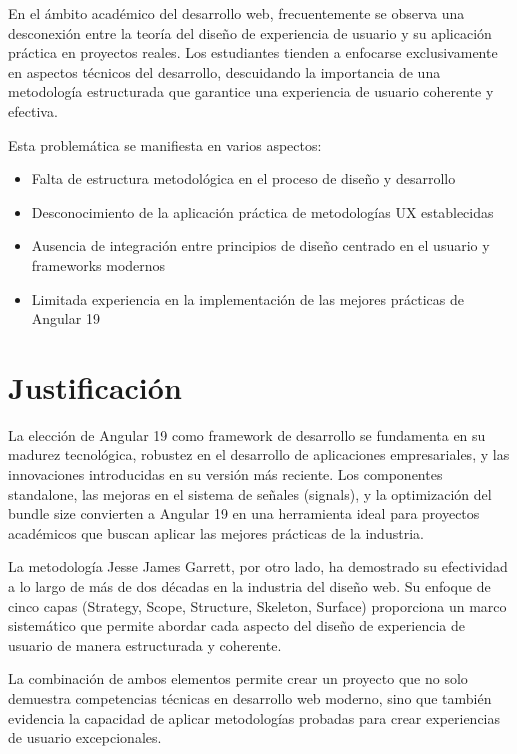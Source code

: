 En el ámbito académico del desarrollo web, frecuentemente se observa una desconexión entre la teoría del diseño de experiencia de usuario y su aplicación práctica en proyectos reales. Los estudiantes tienden a enfocarse exclusivamente en aspectos técnicos del desarrollo, descuidando la importancia de una metodología estructurada que garantice una experiencia de usuario coherente y efectiva.

Esta problemática se manifiesta en varios aspectos:

\begin{itemize}
    \item Falta de estructura metodológica en el proceso de diseño y desarrollo
    \item Desconocimiento de la aplicación práctica de metodologías UX establecidas
    \item Ausencia de integración entre principios de diseño centrado en el usuario y frameworks modernos
    \item Limitada experiencia en la implementación de las mejores prácticas de Angular 19
\end{itemize}

\section{Justificación}

La elección de Angular 19 como framework de desarrollo se fundamenta en su madurez tecnológica, robustez en el desarrollo de aplicaciones empresariales, y las innovaciones introducidas en su versión más reciente. Los componentes standalone, las mejoras en el sistema de señales (signals), y la optimización del bundle size convierten a Angular 19 en una herramienta ideal para proyectos académicos que buscan aplicar las mejores prácticas de la industria.

La metodología Jesse James Garrett, por otro lado, ha demostrado su efectividad a lo largo de más de dos décadas en la industria del diseño web. Su enfoque de cinco capas (Strategy, Scope, Structure, Skeleton, Surface) proporciona un marco sistemático que permite abordar cada aspecto del diseño de experiencia de usuario de manera estructurada y coherente.

La combinación de ambos elementos permite crear un proyecto que no solo demuestra competencias técnicas en desarrollo web moderno, sino que también evidencia la capacidad de aplicar metodologías probadas para crear experiencias de usuario excepcionales.

